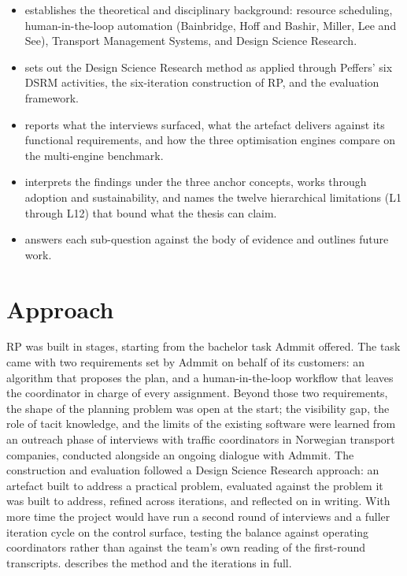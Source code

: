 \begin{itemize}
  \item \textbf{} establishes the theoretical and disciplinary background: resource scheduling, human-in-the-loop automation (Bainbridge, Hoff and Bashir, Miller, Lee and See), Transport Management Systems, and Design Science Research.
  \item \textbf{} sets out the Design Science Research method as applied through Peffers' six DSRM activities, the six-iteration construction of RP, and the evaluation framework.
  \item \textbf{} reports what the interviews surfaced, what the artefact delivers against its functional requirements, and how the three optimisation engines compare on the multi-engine benchmark.
  \item \textbf{} interprets the findings under the three anchor concepts, works through adoption and sustainability, and names the twelve hierarchical limitations (L1 through L12) that bound what the thesis can claim.
  \item \textbf{} answers each sub-question against the body of evidence and outlines future work.
\end{itemize}


\section{Approach}
\label{sec:approach}

RP was built in stages, starting from the bachelor task Admmit offered. The task came with two requirements set by Admmit on behalf of its customers: an algorithm that proposes the plan, and a human-in-the-loop workflow that leaves the coordinator in charge of every assignment. Beyond those two requirements, the shape of the planning problem was open at the start; the visibility gap, the role of tacit knowledge, and the limits of the existing software were learned from an outreach phase of interviews with traffic coordinators in Norwegian transport companies, conducted alongside an ongoing dialogue with Admmit. The construction and evaluation followed a Design Science Research approach: an artefact built to address a practical problem, evaluated against the problem it was built to address, refined across iterations, and reflected on in writing. With more time the project would have run a second round of interviews and a fuller iteration cycle on the control surface, testing the balance against operating coordinators rather than against the team's own reading of the first-round transcripts.  describes the method and the iterations in full.


